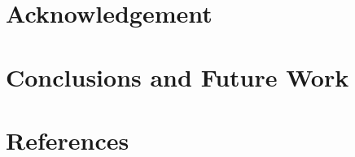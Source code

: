 \documentclass[review]{elsarticle}
\begin{document}
\section{Acknowledgement}

\section{Conclusions and Future Work}

\clearpage

\section*{References}


\end{document}
